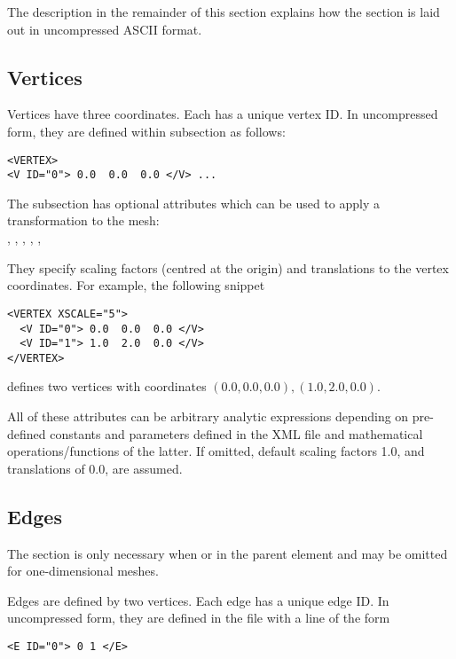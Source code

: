 \begin{notebox}
The description in the remainder of this section explains how the  section is laid out in uncompressed ASCII format.
\end{notebox}


\subsection{Vertices}

Vertices have three coordinates. Each has a unique vertex ID. In
uncompressed form, they are defined within  subsection as follows:
\begin{lstlisting}[style=XMLStyle] <VERTEX>
<V ID="0"> 0.0  0.0  0.0 </V> ...
\end{lstlisting}
The  subsection has optional attributes which can be used to
apply a transformation to the mesh:\\
, , ,
, , 

They specify scaling factors (centred at the origin) and translations to the
vertex coordinates. For example, the following snippet
\begin{lstlisting}[style=XMLStyle]
<VERTEX XSCALE="5">
  <V ID="0"> 0.0  0.0  0.0 </V>
  <V ID="1"> 1.0  2.0  0.0 </V>
</VERTEX>
\end{lstlisting}
defines two vertices with coordinates $(0.0,0.0,0.0), (1.0,2.0,0.0)$.

All of these attributes can be arbitrary analytic expressions depending on pre-
defined constants and parameters defined in the XML file and
mathematical operations/functions of the latter. If omitted, default scaling
factors 1.0, and translations of 0.0, are assumed.



\subsection{Edges}
\begin{tipbox}
    The  section is only necessary when  or
     in the parent  element and may be omitted for
    one-dimensional meshes.
\end{tipbox}

Edges are defined by two vertices. Each edge has a unique edge ID. In
uncompressed form, they are defined in the file with a line of the form
\begin{lstlisting}[style=XMLStyle]
<E ID="0"> 0 1 </E>
\end{lstlisting}


